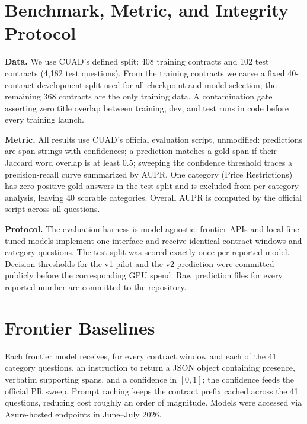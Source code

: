 \documentclass[11pt,letterpaper]{article}
\begin{document}
\section{Benchmark, Metric, and Integrity Protocol}
\label{sec:setup}

\textbf{Data.} We use CUAD's defined split: 408 training contracts and 102
test contracts (4{,}182 test questions). From the training contracts we carve
a fixed 40-contract development split used for all checkpoint and model
selection; the remaining 368 contracts are the only training data. A
contamination gate asserting zero title overlap between training, dev, and
test runs in code before every training launch.

\textbf{Metric.} All results use CUAD's official evaluation script,
unmodified: predictions are span strings with confidences; a prediction
matches a gold span if their Jaccard word overlap is at least 0.5; sweeping
the confidence threshold traces a precision-recall curve summarized by AUPR.
One category (Price Restrictions) has zero positive gold answers in the test
split and is excluded from per-category analysis, leaving 40 scorable
categories. Overall AUPR is computed by the official script across all
questions.

\textbf{Protocol.} The evaluation harness is model-agnostic: frontier APIs
and local fine-tuned models implement one interface and receive identical
contract windows and category questions. The test split was scored exactly
once per reported model. Decision thresholds for the v1 pilot and the v2
prediction were committed publicly before the corresponding GPU spend. Raw
prediction files for every reported number are committed to the repository.

\section{Frontier Baselines}
\label{sec:frontier}

Each frontier model receives, for every contract window and each of the 41
category questions, an instruction to return a JSON object containing
presence, verbatim supporting spans, and a confidence in $[0,1]$; the
confidence feeds the official PR sweep. Prompt caching keeps the contract
prefix cached across the 41 questions, reducing cost roughly an order of
magnitude. Models were accessed via Azure-hosted endpoints in June--July
2026.
\end{document}

